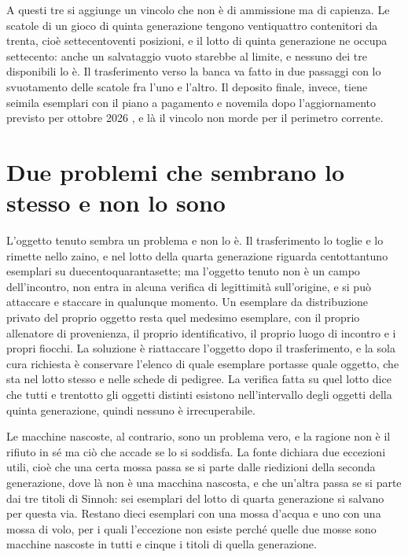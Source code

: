 A questi tre si aggiunge un vincolo che non è di ammissione ma di capienza. Le scatole di un gioco di quinta generazione tengono ventiquattro contenitori da trenta, cioè settecentoventi posizioni, e il lotto di quinta generazione ne occupa settecento: anche un salvataggio vuoto starebbe al limite, e nessuno dei tre disponibili lo è. Il trasferimento verso la banca va fatto in due passaggi con lo svuotamento delle scatole fra l'uno e l'altro. Il deposito finale, invece, tiene seimila esemplari con il piano a pagamento e novemila dopo l'aggiornamento previsto per ottobre 2026 \cite{frlg-home}, e là il vincolo non morde per il perimetro corrente.

\section{Due problemi che sembrano lo stesso e non lo sono}

L'oggetto tenuto sembra un problema e non lo è. Il trasferimento lo toglie e lo rimette nello zaino, e nel lotto della quarta generazione riguarda centottantuno esemplari su duecentoquarantasette; ma l'oggetto tenuto non è un campo dell'incontro, non entra in alcuna verifica di legittimità sull'origine, e si può attaccare e staccare in qualunque momento. Un esemplare da distribuzione privato del proprio oggetto resta quel medesimo esemplare, con il proprio allenatore di provenienza, il proprio identificativo, il proprio luogo di incontro e i propri fiocchi. La soluzione è riattaccare l'oggetto dopo il trasferimento, e la sola cura richiesta è conservare l'elenco di quale esemplare portasse quale oggetto, che sta nel lotto stesso e nelle schede di pedigree. La verifica fatta su quel lotto dice che tutti e trentotto gli oggetti distinti esistono nell'intervallo degli oggetti della quinta generazione, quindi nessuno è irrecuperabile.

Le macchine nascoste, al contrario, sono un problema vero, e la ragione non è il rifiuto in sé ma ciò che accade se lo si soddisfa. La fonte dichiara due eccezioni utili, cioè che una certa mossa passa se si parte dalle riedizioni della seconda generazione, dove là non è una macchina nascosta, e che un'altra passa se si parte dai tre titoli di Sinnoh: sei esemplari del lotto di quarta generazione si salvano per questa via. Restano dieci esemplari con una mossa d'acqua e uno con una mossa di volo, per i quali l'eccezione non esiste perché quelle due mosse sono macchine nascoste in tutti e cinque i titoli di quella generazione.


